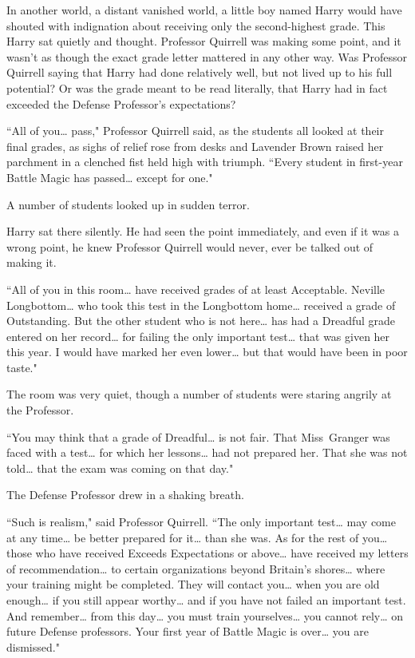 In another world, a distant vanished world, a little boy named Harry would have shouted with indignation about receiving only the second-highest grade. This Harry sat quietly and thought. Professor Quirrell was making some point, and it wasn't as though the exact grade letter mattered in any other way. Was Professor Quirrell saying that Harry had done relatively well, but not lived up to his full potential? Or was the grade meant to be read literally, that Harry had in fact exceeded the Defense Professor's expectations?

``All of you{\ldots} pass," Professor Quirrell said, as the students all looked at their final grades, as sighs of relief rose from desks and Lavender Brown raised her parchment in a clenched fist held high with triumph. ``Every student in first-year Battle Magic has passed{\ldots} except for one."

A number of students looked up in sudden terror.

Harry sat there silently. He had seen the point immediately, and even if it was a wrong point, he knew Professor Quirrell would never, ever be talked out of making it.

``All of you in this room{\ldots} have received grades of at least Acceptable. Neville Longbottom{\ldots} who took this test in the Longbottom home{\ldots} received a grade of Outstanding. But the other student who is not here{\ldots} has had a Dreadful grade entered on her record{\ldots} for failing the only important test{\ldots} that was given her this year. I would have marked her even lower{\ldots} but that would have been in poor taste."

The room was very quiet, though a number of students were staring angrily at the Professor.

``You may think that a grade of Dreadful{\ldots} is not fair. That Miss~Granger was faced with a test{\ldots} for which her lessons{\ldots} had not prepared her. That she was not told{\ldots} that the exam was coming on that day."

The Defense Professor drew in a shaking breath.

``Such is realism," said Professor Quirrell. ``The only important test{\ldots} may come at any time{\ldots} be better prepared for it{\ldots} than she was. As for the rest of you{\ldots} those who have received Exceeds Expectations or above{\ldots} have received my letters of recommendation{\ldots} to certain organizations beyond Britain's shores{\ldots} where your training might be completed. They will contact you{\ldots} when you are old enough{\ldots} if you still appear worthy{\ldots} and if you have not failed an important test. And remember{\ldots} from this day{\ldots} you must train yourselves{\ldots} you cannot rely{\ldots} on future Defense professors. Your first year of Battle Magic is over{\ldots} you are dismissed."

